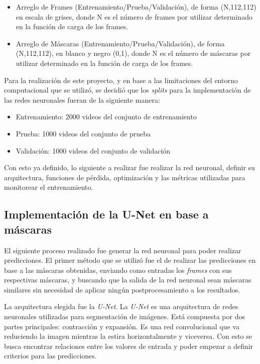 \documentclass[runningheads]{llncs}
\begin{document}
\begin{itemize}
    \item Arreglo de Frames (Entrenamiento/Prueba/Validación), de forma (N,112,112) en escala de grises, donde N es el número de frames por utilizar determinado en la función de carga de los frames.
    \item Arreglo de Máscaras (Entrenamiento/Prueba/Validación), de forma (N,112,112), en blanco y negro (0,1), donde N es el número de máscaras por utilizar determinado en la función de carga de los frames.
\end{itemize}

Para la realización de este proyecto, y en base a las limitaciones del entorno computacional que se utilizó, se decidió que los \textit{splits} para la implementación de las redes neuronales fueran de la siguiente manera:

\begin{itemize}
    \item Entrenamiento: 2000 videos del conjunto de entrenamiento
    \item Prueba: 1000 videos del conjunto de prueba
    \item Validación: 1000 videos del conjunto de validación
\end{itemize}

Con esto ya definido, lo siguiente a realizar fue realizar la red neuronal, definir su arquitectura, funciones de pérdida, optimización y las métricas utilizadas para monitorear el entrenamiento. 

\subsection{Implementación de la U-Net en base a máscaras}
El siguiente proceso realizado fue generar la red neuronal para poder realizar predicciones. El primer método que se utilizó fue el de realizar las predicciones en base a las máscaras obtenidas, enviando como entradas los \textit{frames} con sus respectivas máscaras, y buscando que la salida de la red neuronal sean máscaras similares sin necesidad de aplicar ningún postprocesamiento a los resultados.

La arquitectura elegida fue la \textit{U-Net}. La \textit{U-Net} es una arquitectura de redes neuronales utilizadas para segmentación de imágenes. Está compuesta por dos partes principales: contracción y expansión. Es una red convolucional que va reduciendo la imagen mientras la estira horizontalmente y viceversa. Con esto se busca encontrar relaciones entre los valores de entrada y poder empezar a definir criterios para las predicciones.
\end{document}
